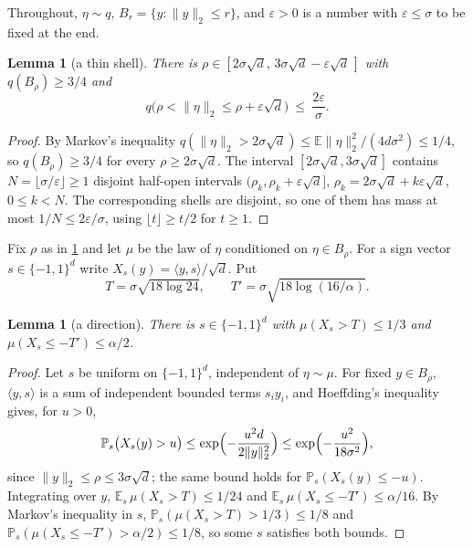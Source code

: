 \documentclass[11pt]{amsart}
\newtheorem{lemma}[theorem]{Lemma}
\theoremstyle{definition}
\theoremstyle{remark}
\newcommand{\E}{\mathbb{E}}
\newcommand{\PP}{\mathbb{P}}
\begin{document}
Throughout, $\eta\sim q$, $B_r=\{y:\|y\|_2\le r\}$, and $\varepsilon>0$ is a number with $\varepsilon\le\sigma$ to
be fixed at the end.

\begin{lemma}[a thin shell]\label{lem:shell}
There is $\rho\in[2\sigma\sqrt d,\,3\sigma\sqrt d-\varepsilon\sqrt d\,]$ with $q(B_\rho)\ge3/4$ and
\[
q\bigl(\rho<\|\eta\|_2\le\rho+\varepsilon\sqrt d\bigr)\ \le\ \frac{2\varepsilon}{\sigma}.
\]
\end{lemma}

\begin{proof}
By Markov's inequality $q(\|\eta\|_2>2\sigma\sqrt d)\le\E\|\eta\|_2^2/(4d\sigma^2)\le1/4$, so $q(B_\rho)\ge3/4$
for every $\rho\ge2\sigma\sqrt d$. The interval $[2\sigma\sqrt d,3\sigma\sqrt d]$ contains
$N=\lfloor\sigma/\varepsilon\rfloor\ge1$ disjoint half-open intervals $(\rho_k,\rho_k+\varepsilon\sqrt d]$,
$\rho_k=2\sigma\sqrt d+k\varepsilon\sqrt d$, $0\le k<N$. The corresponding shells are disjoint, so one of them
has mass at most $1/N\le2\varepsilon/\sigma$, using $\lfloor t\rfloor\ge t/2$ for $t\ge1$.
\end{proof}

Fix $\rho$ as in \cref{lem:shell} and let $\mu$ be the law of $\eta$ conditioned on $\eta\in B_\rho$. For a sign
vector $s\in\{-1,1\}^d$ write $X_s(y)=\langle y,s\rangle/\sqrt d$. Put
\[
T=\sigma\sqrt{18\log24},\qquad T'=\sigma\sqrt{18\log(16/\alpha)} .
\]

\begin{lemma}[a direction]\label{lem:direction}
There is $s\in\{-1,1\}^d$ with $\mu(X_s>T)\le1/3$ and $\mu(X_s\le-T')\le\alpha/2$.
\end{lemma}

\begin{proof}
Let $s$ be uniform on $\{-1,1\}^d$, independent of $\eta\sim\mu$. For fixed $y\in B_\rho$, $\langle y,s\rangle$ is a
sum of independent bounded terms $s_iy_i$, and Hoeffding's inequality gives, for $u>0$,
\[
\PP_s\bigl(X_s(y)>u\bigr)\le\exp\Bigl(-\frac{u^2d}{2\|y\|_2^2}\Bigr)\le\exp\Bigl(-\frac{u^2}{18\sigma^2}\Bigr),
\]
since $\|y\|_2\le\rho\le3\sigma\sqrt d$; the same bound holds for $\PP_s(X_s(y)\le-u)$. Integrating over $y$,
$\E_s\,\mu(X_s>T)\le1/24$ and $\E_s\,\mu(X_s\le-T')\le\alpha/16$. By Markov's inequality in $s$,
$\PP_s(\mu(X_s>T)>1/3)\le1/8$ and $\PP_s(\mu(X_s\le-T')>\alpha/2)\le1/8$, so some $s$ satisfies both bounds.
\end{proof}
\end{document}
